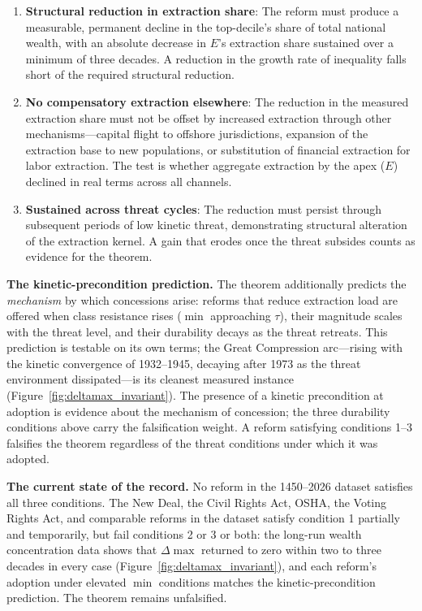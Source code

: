 \begin{enumerate}
    \item \textbf{Structural reduction in extraction share}: The reform must produce a measurable, permanent decline in the top-decile's share of total national wealth, with an absolute decrease in $E$'s extraction share sustained over a minimum of three decades. A reduction in the growth rate of inequality falls short of the required structural reduction.

    \item \textbf{No compensatory extraction elsewhere}: The reduction in the measured extraction share must not be offset by increased extraction through other mechanisms---capital flight to offshore jurisdictions, expansion of the extraction base to new populations, or substitution of financial extraction for labor extraction. The test is whether aggregate extraction by the apex ($E$) declined in real terms across all channels.

    \item \textbf{Sustained across threat cycles}: The reduction must persist through subsequent periods of low kinetic threat, demonstrating structural alteration of the extraction kernel. A gain that erodes once the threat subsides counts as evidence for the theorem.
\end{enumerate}

\textbf{The kinetic-precondition prediction.} The theorem additionally predicts the \textit{mechanism} by which concessions arise: reforms that reduce extraction load are offered when class resistance rises ($\min$ approaching $\tau$), their magnitude scales with the threat level, and their durability decays as the threat retreats. This prediction is testable on its own terms; the Great Compression arc---rising with the kinetic convergence of 1932--1945, decaying after 1973 as the threat environment dissipated---is its cleanest measured instance (Figure~\ref{fig:deltamax_invariant}). The presence of a kinetic precondition at adoption is evidence about the mechanism of concession; the three durability conditions above carry the falsification weight. A reform satisfying conditions 1--3 falsifies the theorem regardless of the threat conditions under which it was adopted.

\textbf{The current state of the record.} No reform in the 1450--2026 dataset satisfies all three conditions. The New Deal, the Civil Rights Act, OSHA, the Voting Rights Act, and comparable reforms in the dataset satisfy condition 1 partially and temporarily, but fail conditions 2 or 3 or both: the long-run wealth concentration data shows that $\Delta\max$ returned to zero within two to three decades in every case (Figure~\ref{fig:deltamax_invariant}), and each reform's adoption under elevated $\min$ conditions matches the kinetic-precondition prediction. The theorem remains unfalsified.

